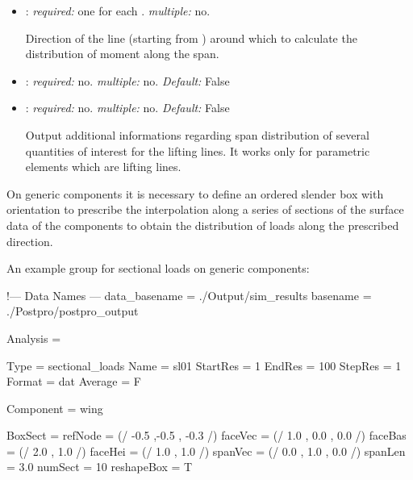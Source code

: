 \begin{itemize}
\item {}: \textit{required:} one for each . \textit{multiple:} no.

Direction of the line (starting from ) around which to calculate the distribution of moment along the span.

\item {}: \textit{required:} no. \textit{multiple:} no. \textit{Default:} False

\item {}: \textit{required:} no. \textit{multiple:} no. \textit{Default:} False

Output additional informations regarding span distribution of several quantities of interest for the lifting lines. It works only for parametric elements which are lifting lines.

\end{itemize}

On generic components it is necessary to define an ordered slender box with orientation to prescribe the interpolation along a series of sections of the surface data of the components to obtain the distribution of loads along the prescribed direction.

An example  group for sectional loads on generic components:

\begin{inputfile}[frame=single, caption={dust\_post.in for sectional load on generic components}, label={file:dust_post.in_sectional_param}]
!--- Data Names ---
data_basename = ./Output/sim_results
basename =     ./Postpro/postpro_output

Analysis = {

Type = sectional_loads
Name = sl01
StartRes = 1
EndRes   = 100 
StepRes  = 1
Format = dat
Average = F

Component = wing

BoxSect = {
 refNode = (/ -0.5 ,-0.5 , -0.3 /)
 faceVec = (/ 1.0 , 0.0 , 0.0 /)
 faceBas = (/ 2.0 , 1.0 /) 
 faceHei = (/ 1.0 , 1.0 /)
 spanVec = (/ 0.0 , 1.0 , 0.0 /)
 spanLen = 3.0
 numSect = 10
 reshapeBox = T 
} 


}
\end{inputfile}


